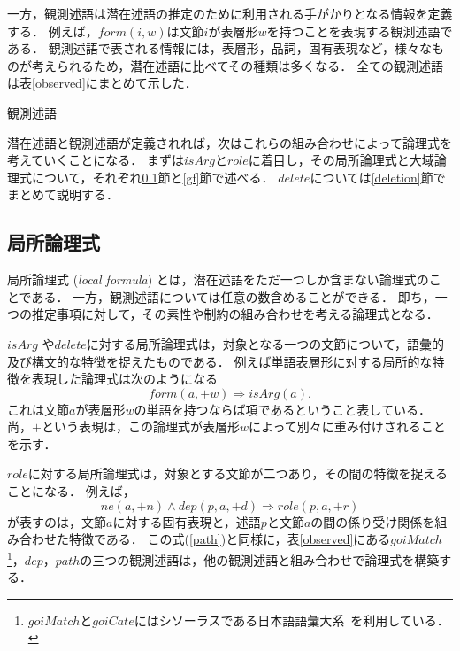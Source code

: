 \documentclass[japanese]{jnlp_1.4}
\begin{document}
一方，観測述語は潜在述語の推定のために利用される手がかりとなる情報を定義する．
例えば，$\mathit{form}(i,w)$は文節$i$が表層形$w$を持つことを表現する観測述語である．
観測述語で表される情報には，表層形，品詞，固有表現など，様々なものが考えられるため，潜在述語に比べてその種類は多くなる．
全ての観測述語は表\ref{observed}にまとめて示した．


\begin{table}[t]
  \caption{観測述語}
\label{observed}

\end{table}

潜在述語と観測述語が定義されれば，次はこれらの組み合わせによって論理式を考えていくことになる．
まずは$\mathit{isArg}$と$\mathit{role}$に着目し，その局所論理式と大域論理式について，それぞれ\ref{lf}節と\ref{gf}節で述べる．
$\mathit{delete}$については\ref{deletion}節でまとめて説明する．


\subsection{局所論理式}
\label{lf}

局所論理式 (\emph{local formula}) とは，潜在述語をただ一つしか含まない論理式のことである．
一方，観測述語については任意の数含めることができる．
即ち，一つの推定事項に対して，その素性や制約の組み合わせを考える論理式となる．

$\mathit{isArg}$ や$\mathit{delete}$に対する局所論理式は，対象となる一つの文節について，語彙的及び構文的な特徴を捉えたものである．
例えば単語表層形に対する局所的な特徴を表現した論理式は次のようになる
\begin{equation}
  \mathit{form}(a,+w) \Rightarrow \mathit{isArg}(a). \label{word}
\end{equation}
これは文節$a$が表層形$w$の単語を持つならば項であるということ表している．
尚，$+$という表現は，この論理式が表層形$w$によって別々に重み付けされることを示す．

$\mathit{role}$に対する局所論理式は，対象とする文節が二つあり，その間の特徴を捉えることになる．
例えば，
\begin{equation}
  \mathit{ne}(a,+n) \wedge \mathit{dep}(p,a,+d) \Rightarrow \mathit{role}(p,a,+r) \label{path}
\end{equation}
が表すのは，文節$a$に対する固有表現と，述語$p$と文節$a$の間の係り受け関係を組み合わせた特徴である．
この式(\ref{path})と同様に，表\ref{observed}にある$\mathit{goiMatch}$\footnote{$\mathit{goiMatch}$と$\mathit{goiCate}$にはシソーラスである日本語語彙大系~\cite{ikehara:1997}を利用している．}，$\mathit{dep}$，$\mathit{path}$の三つの観測述語は，他の観測述語と組み合わせで論理式を構築する．
\end{document}
